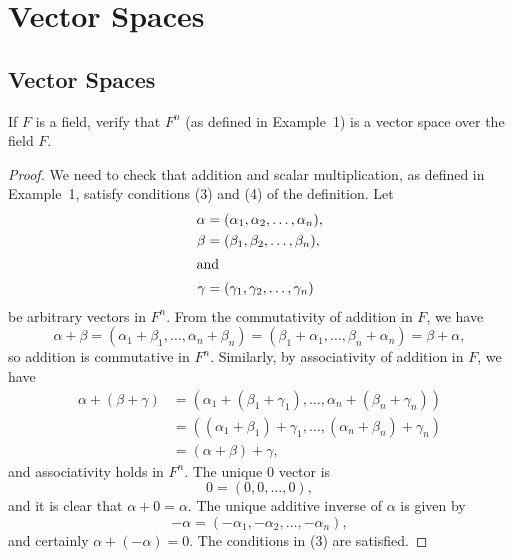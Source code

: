 \chapter{Vector Spaces}

\section{Vector Spaces}

 If $F$ is a field, verify that $F^n$ (as defined in
Example~1) is a vector space over the field $F$.
\begin{proof}
  We need to check that addition and scalar multiplication, as defined
  in Example~1, satisfy conditions (3) and (4) of the definition. Let
  \begin{align*}
    \alpha &= (\alpha_1,\alpha_2,\dots,\alpha_n), \\
    \beta &= (\beta_1,\beta_2,\dots,\beta_n), \\
    \intertext{and}
    \gamma &= (\gamma_1,\gamma_2,\dots,\gamma_n)
  \end{align*}
  be arbitrary vectors in $F^n$. From the commutativity of addition in
  $F$, we have
  \begin{equation*}
    \alpha + \beta
    = (\alpha_1 + \beta_1, \dots, \alpha_n + \beta_n)
    = (\beta_1 + \alpha_1, \dots, \beta_n + \alpha_n)
    = \beta + \alpha,
  \end{equation*}
  so addition is commutative in $F^n$. Similarly, by associativity of
  addition in $F$, we have
  \begin{align*}
    \alpha + (\beta + \gamma)
    &= (\alpha_1 + (\beta_1 + \gamma_1),
      \dots, \alpha_n + (\beta_n + \gamma_n)) \\
    &= ((\alpha_1 + \beta_1) + \gamma_1,
      \dots, (\alpha_n + \beta_n) + \gamma_n) \\
    &= (\alpha + \beta) + \gamma,
  \end{align*}
  and associativity holds in $F^n$. The unique $0$ vector is
  \begin{equation*}
    0 = (0, 0, \dots, 0),
  \end{equation*}
  and it is clear that $\alpha + 0 = \alpha$. The unique additive
  inverse of $\alpha$ is given by
  \begin{equation*}
    -\alpha = (-\alpha_1, -\alpha_2, \dots, -\alpha_n),
  \end{equation*}
  and certainly $\alpha + (-\alpha) = 0$. The conditions in (3) are
  satisfied.


\end{proof}

